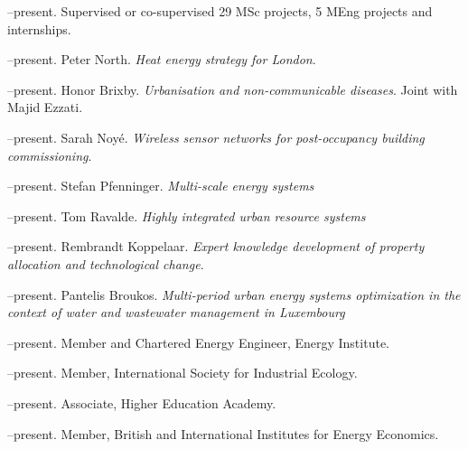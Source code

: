 \documentclass[11pt,a4paper]{article}
\begin{document}
--present. Supervised or co-supervised 29 MSc projects, 5 MEng projects and internships.

\bigskip
\noindent{}%
--present.  Peter North. \emph{Heat energy strategy for London}.

--present.  Honor Brixby. \emph{Urbanisation and non-communicable diseases}.  Joint with Majid Ezzati.

--present.  Sarah Noy\'{e}. \emph{Wireless sensor networks for post-occupancy building commissioning}.  

--present.  Stefan Pfenninger. \emph{Multi-scale energy systems}

--present.  Tom Ravalde. \emph{Highly integrated urban resource systems}

--present.  Rembrandt Koppelaar. \emph{Expert knowledge development of property allocation and technological change}.

--present.  Pantelis Broukos. \emph{Multi-period urban energy systems optimization in the context of water and wastewater management in Luxembourg}
\bigskip

\noindent{}%
%
--present.  Member and Chartered Energy Engineer, Energy Institute.

--present.  Member, International Society for Industrial Ecology.

--present.  Associate, Higher Education Academy.

--present.  Member, British and International Institutes for Energy Economics.
\end{document}
